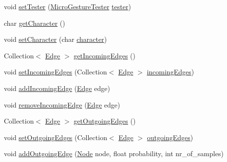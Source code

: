 \begin{DoxyCompactItemize}
\item 
void \hyperlink{classch_1_1zhaw_1_1ba10__bsha__1_1_1graph_1_1Node_a6dcb93d4c25e370c84741db17e59d2af}{setTester} (\hyperlink{classch_1_1zhaw_1_1ba10__bsha__1_1_1service_1_1MicroGestureTester}{MicroGestureTester} \hyperlink{classch_1_1zhaw_1_1ba10__bsha__1_1_1graph_1_1Node_abec03ba4df889f23c0d30d70edee59f6}{tester})
\item 
char \hyperlink{classch_1_1zhaw_1_1ba10__bsha__1_1_1graph_1_1Node_a0e84a9cb9ac03506d3a46af0a8f288f5}{getCharacter} ()
\item 
void \hyperlink{classch_1_1zhaw_1_1ba10__bsha__1_1_1graph_1_1Node_ad1c94b7c86ad5fd14bf0aee9d52189e4}{setCharacter} (char \hyperlink{classch_1_1zhaw_1_1ba10__bsha__1_1_1graph_1_1Node_ab6bd424b381dc0f19d9f49d0b2cb56fc}{character})
\item 
Collection$<$ \hyperlink{classch_1_1zhaw_1_1ba10__bsha__1_1_1graph_1_1Edge}{Edge} $>$ \hyperlink{classch_1_1zhaw_1_1ba10__bsha__1_1_1graph_1_1Node_a315d8069f8d2d0b8d50bbc2b5e57144b}{getIncomingEdges} ()
\item 
void \hyperlink{classch_1_1zhaw_1_1ba10__bsha__1_1_1graph_1_1Node_a18364ede156d636e492a64eeb5306d36}{setIncomingEdges} (Collection$<$ \hyperlink{classch_1_1zhaw_1_1ba10__bsha__1_1_1graph_1_1Edge}{Edge} $>$ \hyperlink{classch_1_1zhaw_1_1ba10__bsha__1_1_1graph_1_1Node_a588bea1c6cceb5f66e5e25115b9b12be}{incomingEdges})
\item 
void \hyperlink{classch_1_1zhaw_1_1ba10__bsha__1_1_1graph_1_1Node_afbf20aec55572fc6c90d2f2541d7eeed}{addIncomingEdge} (\hyperlink{classch_1_1zhaw_1_1ba10__bsha__1_1_1graph_1_1Edge}{Edge} edge)
\item 
void \hyperlink{classch_1_1zhaw_1_1ba10__bsha__1_1_1graph_1_1Node_aa309007d5babe035612662009aa65471}{removeIncomingEdge} (\hyperlink{classch_1_1zhaw_1_1ba10__bsha__1_1_1graph_1_1Edge}{Edge} edge)
\item 
Collection$<$ \hyperlink{classch_1_1zhaw_1_1ba10__bsha__1_1_1graph_1_1Edge}{Edge} $>$ \hyperlink{classch_1_1zhaw_1_1ba10__bsha__1_1_1graph_1_1Node_a6261a952f89dfff7e010c3ddc4a730d8}{getOutgoingEdges} ()
\item 
void \hyperlink{classch_1_1zhaw_1_1ba10__bsha__1_1_1graph_1_1Node_add712262f47c24d3af3b3fa4150566e1}{setOutgoingEdges} (Collection$<$ \hyperlink{classch_1_1zhaw_1_1ba10__bsha__1_1_1graph_1_1Edge}{Edge} $>$ \hyperlink{classch_1_1zhaw_1_1ba10__bsha__1_1_1graph_1_1Node_a130b2d1b8b68b2fe91d3753b23c766e2}{outgoingEdges})
\item 
void \hyperlink{classch_1_1zhaw_1_1ba10__bsha__1_1_1graph_1_1Node_a898dcdd240251792e45ea79352536dce}{addOutgoingEdge} (\hyperlink{classch_1_1zhaw_1_1ba10__bsha__1_1_1graph_1_1Node}{Node} node, float probability, int nr\_\-of\_\-samples)

\end{DoxyCompactItemize}
